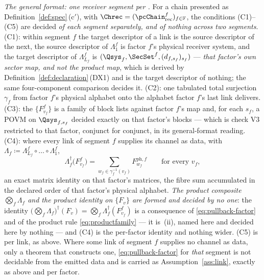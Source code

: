\begin{definition}
\emph{The general format: one receiver segment per .}
For a chain presented as Definition~\ref{def:spec}\,(c$'$), with
$\Chrec=(\pcChain^{f}_{\mathrm{rec}})_{f\in\mathbb{F}}$, the conditions
(C1)--(C5) are decided \emph{of each segment separately, and of nothing
across two segments}. (C1): within segment $f$ the target descriptor of a link
is the source descriptor of the next, the source descriptor of
$\Lambda^{f}_1$ is factor $f$'s physical receiver system, and the target
descriptor of $\Lambda^{f}_{L_f}$ is
$(\Qsys_f,\SecSet^{f},(d_{f,s_f})_{s_f})$ --- \emph{that factor's own sector
map, and not the product map}, which is derived by
Definition~\ref{def:declaration}\,(DX1) and is the target descriptor of
nothing; the same four-component comparison decides it. (C2): one tabulated total surjection
$\gamma_f$ from factor $f$'s physical alphabet onto the alphabet factor $f$'s
last link delivers. (C3): the  $\{F^{f}_{v_f}\}$ is a family of
block lists against factor $f$'s map and, for each $s_f$, a POVM on
$\Qsys_{f,s_f}$ decided exactly on that factor's blocks --- which is check V3
restricted to that factor, conjunct for conjunct, in its general-format
reading. (C4): where every link of segment $f$ supplies its channel as data,
with $\Lambda_f\coloneqq\Lambda^{f}_{L_f}\circ\dots\circ\Lambda^{f}_1$,
\begin{equation}\label{eq:pullback-factor}
  \Lambda_f^{\dagger}\big(F^{f}_{v_f}\big)
  =\sum_{w_f\in\gamma_f^{-1}(v_f)}F^{\mathrm{ph},f}_{w_f}
  \qquad\text{for every }v_f ,
\end{equation}
an exact matrix identity on that factor's matrices, the fibre sum accumulated
in the declared order of that factor's physical alphabet. \emph{The product
composite $\bigotimes_f\Lambda_f$ and the product identity on $\{F_v\}$ are
formed and decided by no one}: the identity
$\big(\bigotimes_f\Lambda_f\big)^{\dagger}(F_v)
=\bigotimes_f\Lambda_f^{\dagger}(F^{f}_{v_f})$ is a consequence of
\eqref{eq:pullback-factor} and of the product rule
\eqref{eq:productfamily} --- it is \,(ii),
named here and decided here by nothing --- and (C4) is the per-factor
identity and nothing wider. (C5) is per link, as above. Where some link of
segment $f$ supplies no channel as data, only a theorem that constructs one,
\eqref{eq:pullback-factor}
for \emph{that} segment is not decidable from the emitted data and is carried
as Assumption~\ref{ass:link}, exactly as above and per factor.


\end{definition}
